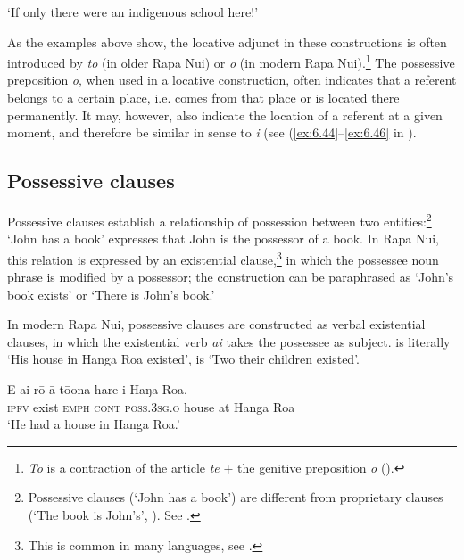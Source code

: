 \glt
‘If only there were an indigenous school here!’ \textstyleExampleref{[R242.061]} 
\z

As the examples above show, the locative adjunct in these constructions is often introduced by \textit{to} (in older Rapa Nui) or \textit{o} (in modern Rapa Nui).\footnote{\label{fn:475}\textit{To} is a contraction of the article \textit{te} + the genitive preposition \textit{o} ().} The possessive preposition \textit{o}, when used in a locative construction, often indicates that a referent belongs to a certain place, i.e. comes from that place or is located there permanently. It may, however, also indicate the location of a referent at a given moment, and therefore be similar in sense to \textit{{\ꞌ}i} (see (\ref{ex:6.44}–\ref{ex:6.46} in ).

\subsection{Possessive clauses}\label{sec:9.3.3}
Possessive clauses establish a relationship of possession between two entities:\footnote{\label{fn:476}Possessive clauses (‘John has a book’) are different from proprietary clauses (‘The book is John’s’, ). See \citet{Clark1969}.}  ‘John has a book’ expresses that John is the possessor of a book. In Rapa Nui, this relation is expressed by an existential clause,\footnote{\label{fn:477}This is common in many languages, see \citet[244]{Dryer2007Clause}.} in which the possessee noun phrase is modified by a possessor; the construction can be paraphrased as ‘John’s book exists’ or ‘There is John’s book.’

In modern Rapa Nui, possessive clauses are constructed as verbal existential clauses, in which the existential verb \textit{ai} takes the possessee as subject.  is literally ‘His house in Hanga Roa existed’,  is ‘Two their children existed’.

\ea\label{ex:9.70}
\gll E ai rō {\ꞌ}ā tō{\ꞌ}ona hare {\ꞌ}i Haŋa Roa. \\
\textsc{ipfv} exist \textsc{emph} \textsc{cont} \textsc{poss.3sg.o} house at Hanga Roa \\

\glt 
‘He had a house in Hanga Roa.’ \textstyleExampleref{[R250.249]} 
\z

